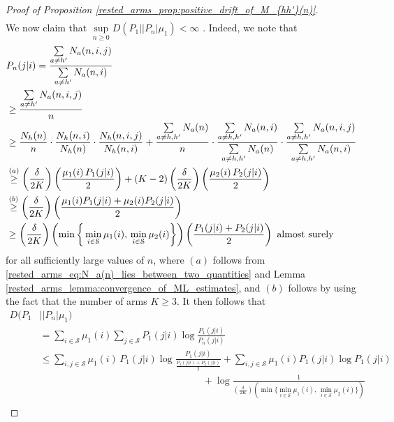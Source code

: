\begin{proof}[Proof of Proposition \ref{rested_arms_prop:positive_drift_of_M_{hh'}(n)}]
\begin{align}
\end{align}\endgroup
We now claim that $\sup\limits_{n\geq 0}D(P_1||P_n|\mu_1)<\infty$ . Indeed, we note that
\begingroup\allowdisplaybreaks\begin{align}
	&P_n(j|i)=\frac{\sum\limits_{a\neq h'}N_a(n,i,j)}{\sum\limits_{a\neq h'}N_a(n,i)}\nonumber\\
	&\geq \frac{\sum\limits_{a\neq h'}N_a(n,i,j)}{n}\nonumber\\
	&\geq \frac{N_h(n)}{n}\cdot \frac{N_h(n,i)}{N_h(n)} \cdot \frac{N_h(n,i,j)}{N_h(n,i)}+\frac{\sum\limits_{a\neq h,h'}N_a(n)}{n} \cdot \frac{\sum\limits_{a\neq h,h'}N_a(n,i)}{\sum\limits_{a\neq h,h'}N_a(n)} \cdot \frac{\sum\limits_{a\neq h,h'}N_a(n,i,j)}{\sum\limits_{a\neq h,h'}N_a(n,i)}\nonumber\\
	&\stackrel{(a)}{\geq} \left(\frac{\delta}{2K}\right)\left(\frac{\mu_1(i)\,P_1(j|i)}{2}\right)+(K-2)\left(\frac{\delta}{2K}\right)\left(\frac{\mu_2(i)\,P_2(j|i)}{2}\right)\nonumber\\
	&\stackrel{(b)}{\geq}\left(\frac{\delta}{2K}\right)\left(\frac{\mu_1(i)P_1(j|i)+\mu_2(i)P_2(j|i)}{2}\right)\nonumber\\
	&\geq \left(\frac{\delta}{2K}\right)\left(\min\bigg\lbrace\min\limits_{i\in\mathcal{S}}\mu_1(i),\,\min\limits_{i\in\mathcal{S}}\mu_2(i)\bigg\rbrace\right)\left(\frac{P_1(j|i)+P_2(j|i)}{2}\right)~\text{\text{almost surely}}\label{rested_arms_eq:liminf_M_{hh'}(n)/n_strictly_positive_1}
\end{align}\endgroup
for all sufficiently large values of $n$, where $(a)$ follows from \eqref{rested_arms_eq:N_a(n)_lies_between_two_quantities} and Lemma \ref{rested_arms_lemma:convergence_of_ML_estimates}, and $(b)$ follows by using the fact that the number of arms $K\geq 3$. It then follows that
\begingroup\allowdisplaybreaks\begin{align} D(P_1 & ||P_n|\mu_1) \\
&=\sum\limits_{i\in\mathcal{S}}\mu_1(i)\sum\limits_{j\in\mathcal{S}}P_1(j|i)\log\frac{P_1(j|i)}{P_n(j|i)}\nonumber\\
	&\leq \sum\limits_{i,j\in\mathcal{S}}\mu_1(i)\,P_1(j|i)\log\frac{P_1(j|i)}{\frac{P_1(j|i)+P_2(j|i)}{2}}+\sum\limits_{i,j\in\mathcal{S}}\mu_1(i)P_1(j|i)\log P_1(j|i)\nonumber\\
	&\hspace{7cm}+\log\frac{1}{\left(\frac{\delta}{2K}\right)\left(\min\bigg\lbrace\min\limits_{i\in\mathcal{S}}\mu_1(i),\,\min\limits_{i\in\mathcal{S}}\mu_2(i)\bigg\rbrace\right)}\nonumber\\

\end{align}
\end{proof}
